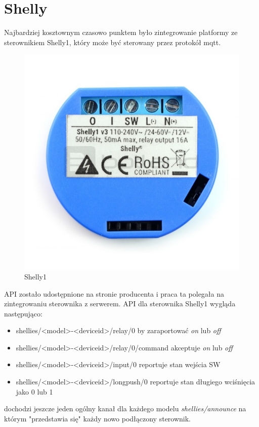\section{Shelly}
Najbardziej kosztownym czasowo punktem było zintegrowanie platformy ze sterownikiem Shelly1, który może być sterowany przez protokół mqtt. \cite{mqtt, shelly}
\begin{figure}[h]
  \centering
  \includegraphics[width=\linewidth/2]{shelly1.jpg}
  \caption{Shelly1}
  \label{fig:shelly}
\end{figure}
API zostało udostępnione na stronie producenta i praca ta polegała na zintegrowaniu sterownika z serwerem.
API dla sterownika Shelly1 wygląda następująco:
\begin{itemize}
    \item shellies/<model>-<deviceid>/relay/0 by zaraportować \textit{on} lub \textit{off}
    \item shellies/<model>-<deviceid>/relay/0/command akceptuje \textit{on} lub \textit{off}
    \item shellies/<model>-<deviceid>/input/0 reportuje stan wejścia SW
    \item shellies/<model>-<deviceid>/longpush/0 reportuje stan długiego wciśnięcia jako 0 lub 1
\end{itemize}
dochodzi jeszcze jeden ogólny kanał dla każdego modelu \textit{shellies/announce} na którym "przedstawia się" każdy nowo podłączony sterownik.
